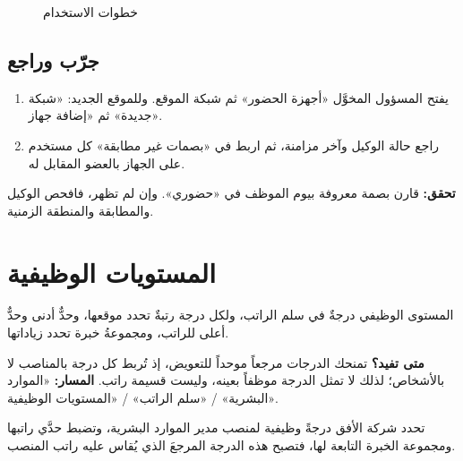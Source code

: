 \begin{figure}[H]
\centering
{}
\rclegend
\caption{خطوات الاستخدام}
\label{fig:hr-feature-attendance-terminals-flow}
\end{figure}

\subsection{جرّب وراجع}

\begin{enumerate}
  \item يفتح المسؤول المخوَّل «أجهزة الحضور» ثم شبكة الموقع. وللموقع الجديد: «شبكة جديدة» ثم «إضافة جهاز».
  \item راجع حالة الوكيل وآخر مزامنة، ثم اربط في «بصمات غير مطابقة» كل مستخدم على الجهاز بالعضو المقابل له.
\end{enumerate}

\textbf{تحقق:} قارن بصمة معروفة بيوم الموظف في «حضوري». وإن لم تظهر، فافحص الوكيل والمطابقة والمنطقة الزمنية.

\clearpage
\section{المستويات الوظيفية}
\label{sec:hr-feature-seniority-levels}

المستوى الوظيفي درجةٌ في سلم الراتب، ولكل درجة رتبةٌ تحدد موقعها، وحدٌّ أدنى وحدٌّ أعلى للراتب، ومجموعةُ خبرة تحدد زياداتها.

\textbf{متى تفيد؟} تمنحك الدرجات مرجعاً موحداً للتعويض، إذ تُربط كل درجة بالمناصب لا بالأشخاص؛ لذلك لا تمثل الدرجة موظفاً بعينه، وليست قسيمة راتب. \textbf{المسار:} «الموارد البشرية» / «سلم الراتب» / «المستويات الوظيفية».

\begin{rcnote}
تحدد شركة الأفق درجةً وظيفية لمنصب مدير الموارد البشرية، وتضبط حدَّي راتبها ومجموعة الخبرة التابعة لها، فتصبح هذه الدرجة المرجعَ الذي يُقاس عليه راتب المنصب.
\end{rcnote}

